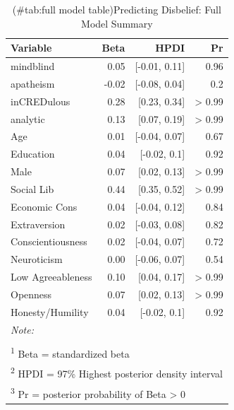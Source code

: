 \documentclass[english,man,mask]{article}
\begin{document}
\begin{table}[!h]

\caption{(\#tab:full model table)Predicting Disbelief: Full Model Summary}
\centering
\begin{tabular}[t]{lrrr}
\toprule
Variable & Beta & HPDI & Pr\\
\midrule
mindblind & 0.05 & [-0.01, 0.11] & 0.96\\
apatheism & -0.02 & [-0.08, 0.04] & 0.2\\
inCREDulous & 0.28 & [0.23, 0.34] & > 0.99\\
analytic & 0.13 & [0.07, 0.19] & > 0.99\\
\hspace{1em}Age & 0.01 & [-0.04, 0.07] & 0.67\\
\addlinespace
\hspace{1em}Education & 0.04 & [-0.02, 0.1] & 0.92\\
\hspace{1em}Male & 0.07 & [0.02, 0.13] & > 0.99\\
\hspace{1em}Social Lib & 0.44 & [0.35, 0.52] & > 0.99\\
\hspace{1em}Economic Cons & 0.04 & [-0.04, 0.12] & 0.84\\
\hspace{1em}Extraversion & 0.02 & [-0.03, 0.08] & 0.82\\
\addlinespace
\hspace{1em}Conscientiousness & 0.02 & [-0.04, 0.07] & 0.72\\
\hspace{1em}Neuroticism & 0.00 & [-0.06, 0.07] & 0.54\\
\hspace{1em}Low Agreeableness & 0.10 & [0.04, 0.17] & > 0.99\\
\hspace{1em}Openness & 0.07 & [0.02, 0.13] & > 0.99\\
\hspace{1em}Honesty/Humility & 0.04 & [-0.02, 0.1] & 0.92\\
\bottomrule
\multicolumn{4}{l}{\textit{Note: }}\\
\multicolumn{4}{l}{ }\\
\multicolumn{4}{l}{\textsuperscript{1} Beta = standardized beta}\\
\multicolumn{4}{l}{\textsuperscript{2} HPDI = 97\% Highest posterior density interval}\\
\multicolumn{4}{l}{\textsuperscript{3} Pr = posterior probability of Beta > 0}\\
\end{tabular}
\end{table}
\end{document}
